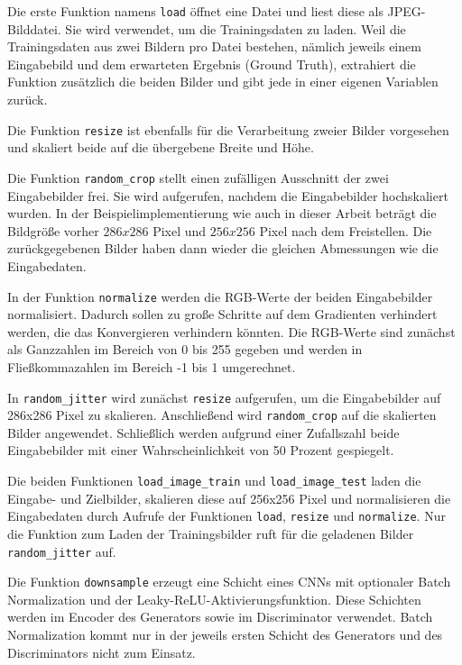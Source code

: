 Die erste Funktion namens \lstinline|load| öffnet eine Datei und liest diese als JPEG-Bilddatei. Sie wird verwendet, um die Trainingsdaten zu laden. Weil die Trainingsdaten aus zwei Bildern pro Datei bestehen, nämlich jeweils einem Eingabebild und dem erwarteten Ergebnis (Ground Truth), extrahiert die Funktion zusätzlich die beiden Bilder und gibt jede in einer eigenen Variablen zurück.

Die Funktion \lstinline|resize| ist ebenfalls für die Verarbeitung zweier Bilder vorgesehen und skaliert beide auf die übergebene Breite und Höhe.

Die Funktion \lstinline|random_crop| stellt einen zufälligen Ausschnitt der zwei Eingabebilder frei. Sie wird aufgerufen, nachdem die Eingabebilder hochskaliert wurden. In der Beispielimplementierung wie auch in dieser Arbeit beträgt die Bildgröße vorher $286x286$ Pixel und $256x256$ Pixel nach dem Freistellen. Die zurückgegebenen Bilder haben dann wieder die gleichen Abmessungen wie die Eingabedaten.

In der Funktion \lstinline|normalize| werden die RGB-Werte der beiden Eingabebilder normalisiert. Dadurch sollen zu große Schritte auf dem Gradienten verhindert werden, die das Konvergieren verhindern könnten. \cite{chollet2021deep} Die RGB-Werte sind zunächst als Ganzzahlen im Bereich von 0 bis 255 gegeben und werden in Fließkommazahlen im Bereich -1 bis 1 umgerechnet.

In \lstinline|random_jitter| wird zunächst \lstinline|resize| aufgerufen, um die Eingabebilder auf 286x286 Pixel zu skalieren. Anschließend wird \lstinline|random_crop| auf die skalierten Bilder angewendet. Schließlich werden aufgrund einer Zufallszahl beide Eingabebilder mit einer Wahrscheinlichkeit von 50 Prozent gespiegelt.

Die beiden Funktionen \lstinline|load_image_train| und \lstinline|load_image_test| laden die Eingabe- und Zielbilder, skalieren diese auf 256x256 Pixel und normalisieren die Eingabedaten durch Aufrufe der Funktionen \lstinline|load|, \lstinline|resize| und \lstinline|normalize|. Nur die Funktion zum Laden der Trainingsbilder ruft für die geladenen Bilder \lstinline|random_jitter| auf.

Die Funktion \lstinline|downsample| erzeugt eine Schicht eines CNNs mit optionaler Batch Normalization und der Leaky-ReLU-Aktivierungsfunktion. Diese Schichten werden im Encoder des Generators sowie im Discriminator verwendet. Batch Normalization kommt nur in der jeweils ersten Schicht des Generators und des Discriminators nicht zum Einsatz.

